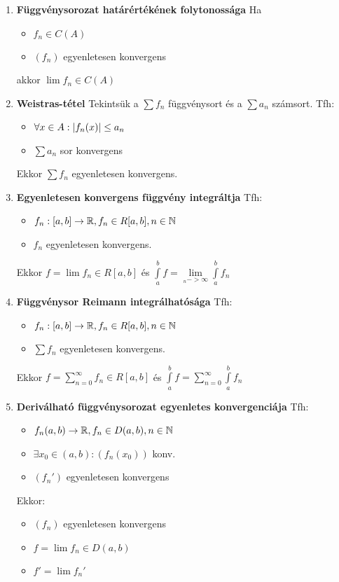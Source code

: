 \documentclass{article}
\begin{document}
\begin{enumerate}
	\item\textbf{Függvénysorozat határértékének folytonossága}\br
	Ha \begin{itemize}
		\item $f_n\in C(A)$
		\item $(f_n)$ egyenletesen konvergens
	\end{itemize}
	akkor $\lim f_n\in C(A)$
	
	\item\textbf{Weistras-tétel}\br
	Tekintsük a $\sum f_n$ függvénysort és a $\sum a_n$ számsort. Tfh:
	\begin{itemize}
		\item $\forall x\in A:\abs{f_n(x)}\leq a_n$
		\item $\sum a_n$ sor konvergens
	\end{itemize}
	Ekkor $\sum f_n$ egyenletesen konvergens.
	
	\item\textbf{Egyenletesen konvergens függvény integráltja}\br
	Tfh: \begin{itemize}
		\item $f_n:[a,b]\rightarrow\mathbb{R},f_n\in R[a,b],n\in\mathbb{N}$
		\item $f_n$ egyenletesen konvergens.
	\end{itemize}
	Ekkor $f=\lim f_n\in R[a,b]$ és $\int\limits_a^b f=\lim\limits_{_n->\infty}
	\int\limits_a^b f_n$
	\newpage
	
	\item\textbf{Függvénysor Reimann integrálhatósága}\br
	Tfh: \begin{itemize}
		\item $f_n:[a,b]\rightarrow\mathbb{R},f_n\in R[a,b],n\in\mathbb{N}$
		\item $\sum f_n$ egyenletesen konvergens.
	\end{itemize}
	Ekkor $f=\sum\limits_{n=0}^\infty f_n\in R[a,b]$ és $\int\limits_a^b f=
	\sum\limits_{n=0}^\infty\int\limits_a^b f_n$
	
	\item\textbf{Deriválható függvénysorozat egyenletes konvergenciája}\br
	Tfh: \begin{itemize}
		\item $f_n(a,b)\rightarrow\mathbb{R},f_n\in D(a,b), n\in\mathbb{N}$
		\item $\exists x_0\in(a,b):(f_n(x_0))$ konv.
		\item $(f_n')$ egyenletesen konvergens
	\end{itemize}
	Ekkor: \begin{itemize}
		\item $(f_n)$ egyenletesen konvergens
		\item $f=\lim f_n\in D(a,b)$
		\item $f'=\lim f_n'$
	\end{itemize}


\end{enumerate}
\end{document}
